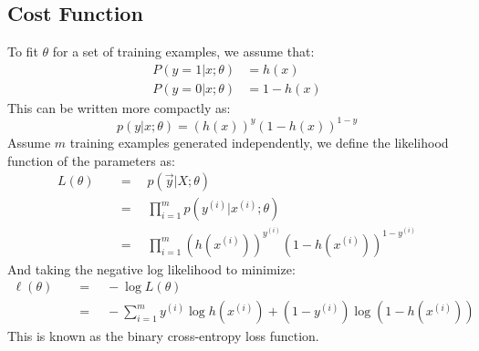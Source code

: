\documentclass[twoside,twocolumn]{article}
\begin{document}
\subsection{Cost Function}
To fit $\theta$ for a set of training examples, we assume that:
\begin{equation}
  \begin{aligned}
    P ( y = 1 | x ; \theta ) & = h( x ) \\
    P ( y = 0 | x ; \theta ) & = 1 - h( x )
  \end{aligned}
\end{equation}
This can be written more compactly as:
\begin{equation}
  p ( y | x ; \theta ) = \left( h ( x ) \right) ^ { y } \left( 1 - h ( x ) \right) ^ { 1 - y }
\end{equation}
Assume $m$ training examples generated independently, we define the likelihood
function of the parameters as:
\begin{equation}
  \begin{aligned}
    L ( \theta ) \quad & = \quad p \left( \vec{y} | X ; \theta \right) \\
    & = \quad \prod _ { i = 1 } ^ { m } p \left( y ^ { ( i ) } | x ^ { ( i ) } ; \theta \right) \\
    & = \quad \prod _ { i = 1 } ^ { m } \left( h \left( x ^ { ( i ) } \right) \right) ^ { y ^ { ( i ) } } \left( 1 - h  \left( x ^ { ( i ) } \right) \right) ^ { 1 - y ^ { ( i ) } }
  \end{aligned}
\end{equation}
And taking the negative log likelihood to minimize:
\begin{equation}
  \begin{aligned}
    \ell ( \theta ) \quad & = \quad -\log L ( \theta ) \\
    & = \quad -\sum _ { i = 1 } ^ { m } y ^ { ( i ) } \log h \left( x ^ { ( i ) } \right) + \left( 1 - y ^ { ( i ) } \right) \log \left( 1 - h \left( x ^ { ( i ) } \right) \right)
  \end{aligned}
\end{equation}
This is known as the binary cross-entropy loss function.
\end{document}
